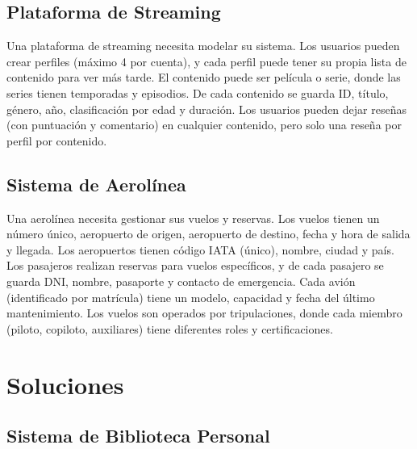 \documentclass[12pt]{article}
\begin{document}
\subsection{Plataforma de Streaming}
Una plataforma de streaming necesita modelar su sistema. Los usuarios pueden crear perfiles (máximo 4 por cuenta), y cada perfil puede tener su propia lista de contenido para ver más tarde. El contenido puede ser película o serie, donde las series tienen temporadas y episodios. De cada contenido se guarda ID, título, género, año, clasificación por edad y duración. Los usuarios pueden dejar reseñas (con puntuación y comentario) en cualquier contenido, pero solo una reseña por perfil por contenido.

\subsection{Sistema de Aerolínea}
Una aerolínea necesita gestionar sus vuelos y reservas. Los vuelos tienen un número único, aeropuerto de origen, aeropuerto de destino, fecha y hora de salida y llegada. Los aeropuertos tienen código IATA (único), nombre, ciudad y país. Los pasajeros realizan reservas para vuelos específicos, y de cada pasajero se guarda DNI, nombre, pasaporte y contacto de emergencia. Cada avión (identificado por matrícula) tiene un modelo, capacidad y fecha del último mantenimiento. Los vuelos son operados por tripulaciones, donde cada miembro (piloto, copiloto, auxiliares) tiene diferentes roles y certificaciones.

\newpage
\section{Soluciones}

\subsection{Sistema de Biblioteca Personal}
\begin{center}
\end{center}
\end{document}
